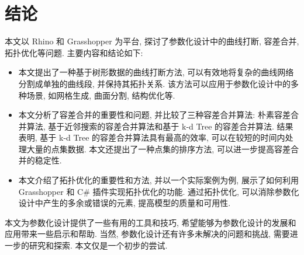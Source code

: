 
\section{结论}

本文以 Rhino 和 Grasshopper 为平台, 探讨了参数化设计中的曲线打断, 容差合并, 拓扑优化等问题.
主要内容和结论如下:
\begin{itemize}
  \item 本文提出了一种基于树形数据的曲线打断方法, 可以有效地将复杂的曲线网络分割成单独的曲线段, 并保持其拓扑关系.
        该方法可以应用于参数化设计中的多种场景, 如网格生成, 曲面分割, 结构优化等.
  \item 本文分析了容差合并的重要性和问题, 并比较了三种容差合并算法: 朴素容差合并算法, 基于近邻搜索的容差合并算法和基于 k-d Tree 的容差合并算法.
        结果表明, 基于 k-d Tree 的容差合并算法具有最高的效率, 可以在较短的时间内处理大量的点集数据.
        本文还提出了一种点集的排序方法, 可以进一步提高容差合并的稳定性.
  \item 本文介绍了拓扑优化的重要性和方法, 并以一个实际案例为例, 展示了如何利用 Grasshopper 和 C\# 插件实现拓扑优化的功能.
        通过拓扑优化, 可以消除参数化设计中产生的多余或错误的元素, 提高模型的质量和可用性.
\end{itemize}

本文为参数化设计提供了一些有用的工具和技巧, 希望能够为参数化设计的发展和应用带来一些启示和帮助.
当然, 参数化设计还有许多未解决的问题和挑战, 需要进一步的研究和探索.
本文仅是一个初步的尝试.
